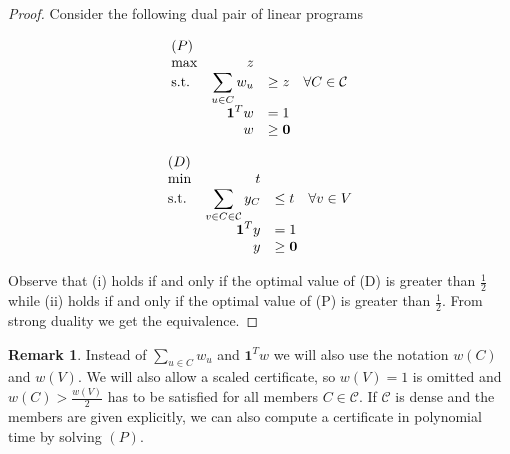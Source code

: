 \documentclass[a4paper, 12pt, twoside=false]{scrbook}
\theoremstyle{definition}
\newtheorem*{remark}{Remark}
\begin{document}
\begin{proof}
    Consider the following dual pair of linear programs
    \newline
    \newline
    \begin{minipage}{.5\linewidth}
        \begin{equation*}
            \begin{array}{l@{\quad} r l l}
                (P)\\
                \max          &z   \\
                \mathrm{s.t.}  &\displaystyle\sum\limits_{u\in C} w_u &\geq  z \quad \forall C \in \mathcal{C} \\
                    & \textbf{1}^Tw &=   1 \\
                    &   w &\geq   \textbf{0}
            \end{array}
        \end{equation*}
    \end{minipage}
    \begin{minipage}{.5\linewidth}
        \begin{equation*}
            \begin{array}{l@{\quad} r l l}
                (D)\\
                \min          &t   \\
                \mathrm{s.t.}  &\displaystyle\sum\limits_{v \in C \in \mathcal{C}} y_C &\leq  t \quad \forall v \in V \\
                    & \textbf{1}^Ty &=   1 \\
                    &   y &\geq   \textbf{0}
            \end{array}
        \end{equation*}
    \end{minipage}
    \newline
    \newline
    Observe that (i) holds if and only if the optimal value of (D) is greater than $\frac 12$ while (ii) holds if and only if the optimal value of (P) is greater than $\frac 12$.
    From strong duality we get the equivalence.
\end{proof}

\begin{remark}
    Instead of $\sum_{u \in C} w_u$ and $\textbf{1}^Tw$ we will also use the notation $w(C)$ and $w(V)$. We will also allow a scaled certificate, so $w(V)=1$ is omitted and $w(C) > \frac {w(V)}{2}$ has to be satisfied for all members $C \in \mathcal{C}$. If $\mathcal{C}$ is dense and the members are given explicitly, we can also compute a certificate in polynomial time by solving $(P)$.
\end{remark}
\end{document}
